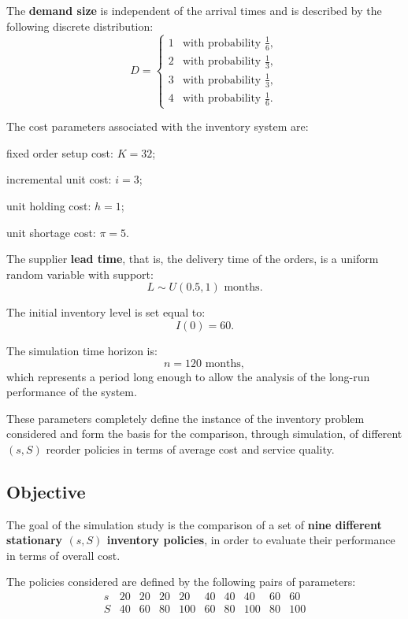 The \textbf{demand size} is independent of the arrival times and is described
by the following discrete distribution:
\[
D =
\begin{cases}
1 & \text{with probability } \frac{1}{6}, \\
2 & \text{with probability } \frac{1}{3}, \\
3 & \text{with probability } \frac{1}{3}, \\
4 & \text{with probability } \frac{1}{6}.
\end{cases}
\]

The cost parameters associated with the inventory system are:
\begin{compactitemize}
    \item fixed order setup cost: $K = 32$;
    \item incremental unit cost: $i = 3$;
    \item unit holding cost: $h = 1$;
    \item unit shortage cost: $\pi = 5$.
\end{compactitemize}

The supplier \textbf{lead time}, that is, the delivery time of the orders, is a
uniform random variable with support:
\[
L \sim U(0.5, 1) \text{ months}.
\]

The initial inventory level is set equal to:
\[
I(0) = 60.
\]

The simulation time horizon is:
\[
n = 120 \text{ months},
\]
which represents a period long enough to allow the analysis of the
long-run performance of the system.

These parameters completely define the instance of the inventory problem
considered and form the basis for the comparison, through simulation, of different
$(s,S)$ reorder policies in terms of average cost and service quality.

\subsection{Objective}

The goal of the simulation study is the comparison of a set of
\textbf{nine different stationary $(s,S)$ inventory policies}, in order to
evaluate their performance in terms of overall cost.

The policies considered are defined by the following pairs of parameters:
\[
\begin{array}{c|ccccccccc}
s & 20 & 20 & 20 & 20 & 40 & 40 & 40 & 60 & 60 \\
S & 40 & 60 & 80 & 100 & 60 & 80 & 100 & 80 & 100
\end{array}
\]

